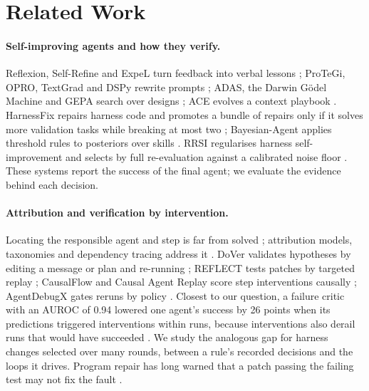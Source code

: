 \documentclass[11pt]{article}
\begin{document}
\section{Related Work}

\paragraph{Self-improving agents and how they verify.}
Reflexion, Self-Refine and ExpeL turn feedback into verbal lessons \citep{shinn2023reflexion,madaan2023selfrefine,zhao2024expel}; ProTeGi, OPRO, TextGrad and DSPy rewrite prompts \citep{pryzant2023protegi,yang2024opro,yuksekgonul2025textgrad,khattab2024dspy}; ADAS, the Darwin G\"odel Machine and GEPA search over designs \citep{hu2025adas,zhang2025dgm,agrawal2025gepa}; ACE evolves a context playbook \citep{zhang2026ace}. HarnessFix repairs harness code and promotes a bundle of repairs only if it solves more validation tasks while breaking at most two \citep{chen2026harnessfix}; Bayesian-Agent applies threshold rules to posteriors over skills \citep{wu2026bayesianagent}. RRSI regularises harness self-improvement and selects by full re-evaluation against a calibrated noise floor \citep{rrsi2026}. These systems report the success of the final agent; we evaluate the evidence behind each decision.

\paragraph{Attribution and verification by intervention.}
Locating the responsible agent and step is far from solved \citep{zhang2025whichagent,liu2026whowhenpro}; attribution models, taxonomies and dependency tracing address it \citep{zhang2026agentracer,zhu2025agentdebug,li2026errorprobe,cemri2025mast,cemri2026adamast}. DoVer validates hypotheses by editing a message or plan and re-running \citep{ma2025dover}; REFLECT tests patches by targeted replay \citep{lin2026reflect}; CausalFlow and Causal Agent Replay score step interventions causally \citep{bonagiri2026causalflow,shah2026car}; AgentDebugX gates reruns by policy \citep{zhu2026agentdebugx}. Closest to our question, a failure critic with an AUROC of 0.94 lowered one agent's success by 26 points when its predictions triggered interventions within runs, because interventions also derail runs that would have succeeded \citep{vasudev2026intervention}. We study the analogous gap for harness changes selected over many rounds, between a rule's recorded decisions and the loops it drives. Program repair has long warned that a patch passing the failing test may not fix the fault \citep{smith2015overfitting}.
\end{document}
